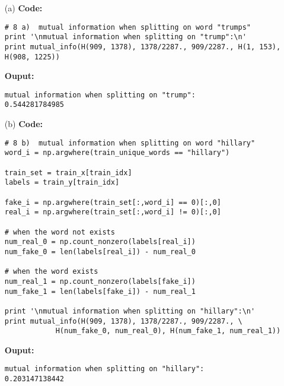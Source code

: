 \documentclass{article}
\begin{document}
\begin{enumerate}
\item[(a)]
\textbf{Code:}
\begin{verbatim}
# 8 a)  mutual information when splitting on word "trumps"
print '\nmutual information when splitting on "trump":\n'
print mutual_info(H(909, 1378), 1378/2287., 909/2287., H(1, 153), H(908, 1225))
\end{verbatim}

\textbf{Ouput:}
\begin{verbatim}
mutual information when splitting on "trump":
0.544281784985
\end{verbatim}
\item[(b)]
\textbf{Code:}
\begin{verbatim}
# 8 b)  mutual information when splitting on word "hillary"
word_i = np.argwhere(train_unique_words == "hillary")

train_set = train_x[train_idx]
labels = train_y[train_idx]

fake_i = np.argwhere(train_set[:,word_i] == 0)[:,0]
real_i = np.argwhere(train_set[:,word_i] != 0)[:,0]

# when the word not exists
num_real_0 = np.count_nonzero(labels[real_i])
num_fake_0 = len(labels[real_i]) - num_real_0

# when the word exists
num_real_1 = np.count_nonzero(labels[fake_i])
num_fake_1 = len(labels[fake_i]) - num_real_1

print '\nmutual information when splitting on "hillary":\n'
print mutual_info(H(909, 1378), 1378/2287., 909/2287., \
            H(num_fake_0, num_real_0), H(num_fake_1, num_real_1))
\end{verbatim}

\textbf{Ouput:}
\begin{verbatim}
mutual information when splitting on "hillary":
0.203147138442
\end{verbatim}

\end{enumerate}
\end{document}
